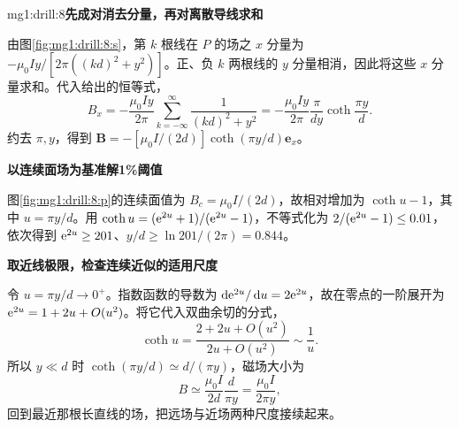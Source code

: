 \begin{drillsolution}{mg1:drill:8}\textbf{先成对消去分量，再对离散导线求和}\par\nobreak
由图\ref{fig:mg1:drill:8:s}，第 $k$ 根线在 $P$ 的场之 $x$ 分量为 $-\mu_0Iy/[2\pi((kd)^2+y^2)]$。正、负 $k$ 两根线的 $y$ 分量相消，因此将这些 $x$ 分量求和。代入给出的恒等式，
\[
 B_x=-\frac{\mu_0Iy}{2\pi}\sum_{k=-\infty}^{\infty}
 \frac1{(kd)^2+y^2}
 =-\frac{\mu_0Iy}{2\pi}\frac{\pi}{dy}\coth\frac{\pi y}{d}.
\]
约去 $\pi,y$，得到 $\bm B=-[\mu_0I/(2d)]\coth(\pi y/d)\bm e_x$。



\par\medskip{}\noindent\textbf{以连续面场为基准解1\%阈值}\par\nobreak
图\ref{fig:mg1:drill:8:p}的连续面值为 $B_c=\mu_0I/(2d)$，故相对增加为 $\coth u-1$，其中 $u=\pi y/d$。用 $\coth u=(\mathrm e^{2u}+1)/(\mathrm e^{2u}-1)$，不等式化为 $2/(\mathrm e^{2u}-1)\le0.01$，依次得到 $\mathrm e^{2u}\ge201$、$y/d\ge\ln201/(2\pi)=0.844$。

\par\medskip{}\noindent\textbf{取近线极限，检查连续近似的适用尺度}\par\nobreak
令 $u=\pi y/d\to0^+$。指数函数的导数为 $\mathop{}\!\mathrm d\mathrm e^{2u}/\mathop{}\!\mathrm d u=2\mathrm e^{2u}$，故在零点的一阶展开为 $\mathrm e^{2u}=1+2u+O(u^2)$。将它代入双曲余切的分式，
\[
 \coth u=\frac{2+2u+O(u^2)}{2u+O(u^2)}\sim\frac1u.
\]
所以 $y\ll d$ 时 $\coth(\pi y/d)\simeq d/(\pi y)$，磁场大小为
\[
 B\simeq\frac{\mu_0I}{2d}\frac{d}{\pi y}
 =\frac{\mu_0I}{2\pi y},
\]
回到最近那根长直线的场，把远场与近场两种尺度接续起来。\end{drillsolution}
